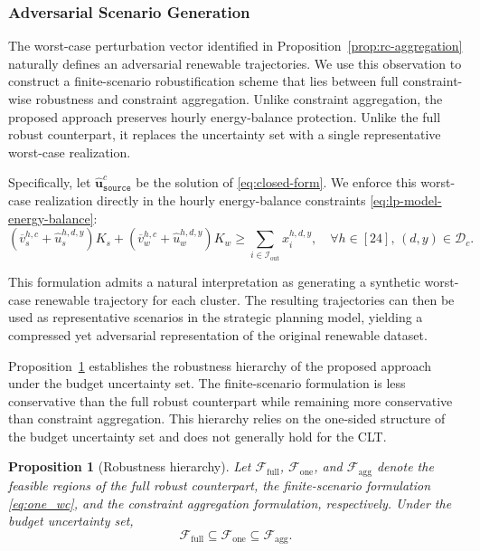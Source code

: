 \documentclass[11pt, letter]{article}
\newtheorem{proposition}[theorem]{Proposition}
\begin{document}
\subsubsection{Adversarial Scenario Generation}

The worst-case perturbation vector identified in Proposition~\ref{prop:rc-aggregation} naturally defines an adversarial renewable trajectories. We use this observation to construct a finite-scenario robustification scheme that lies between full constraint-wise robustness and constraint aggregation. Unlike constraint aggregation, the proposed approach preserves hourly energy-balance protection. Unlike the full robust counterpart, it replaces the uncertainty set with a single representative worst-case realization.

Specifically, let $\hat{\boldsymbol{u}}^c_\texttt{source}$ be the solution of \eqref{eq:closed-form}. We enforce this worst-case realization directly in the hourly energy-balance constraints \eqref{eq:lp-model-energy-balance}:
\begin{equation}\label{eq:one_wc}
     (\overline{v}_s^{h,c} + \hat{u}_s^{h,d,y}) K_s
     +
     (\overline{v}_w^{h,c} + \hat{u}_w^{h,d,y}) K_w
     \ge
     \sum_{i \in \mathcal{I}_\text{out}} x_{i}^{h,d,y},
     \quad
     \forall h \in [24],\,
     (d,y) \in \mathcal{D}_c .
\end{equation}

This formulation admits a natural interpretation as generating a synthetic worst-case renewable trajectory for each cluster. The resulting trajectories can then be used as representative scenarios in the strategic planning model, yielding a compressed yet adversarial representation of the original renewable dataset.

Proposition~\ref{thm:hierarchy} establishes the robustness hierarchy of the proposed approach under the budget uncertainty set. The finite-scenario formulation is less conservative than the full robust counterpart while remaining more conservative than constraint aggregation. This hierarchy relies on the one-sided structure of the budget uncertainty set and does not generally hold for the CLT.
\begin{proposition}[Robustness hierarchy]\label{thm:hierarchy}
Let $\mathcal{F}_{\mathrm{full}}$, $\mathcal{F}_{\mathrm{one}}$, and $\mathcal{F}_{\mathrm{agg}}$ denote the feasible regions of the full robust counterpart, the finite-scenario formulation \eqref{eq:one_wc}, and the constraint aggregation formulation, respectively. Under the budget uncertainty set,
\[
\mathcal{F}_{\mathrm{full}}
\subseteq
\mathcal{F}_{\mathrm{one}}
\subseteq
\mathcal{F}_{\mathrm{agg}}.
\]
\end{proposition}
\end{document}
